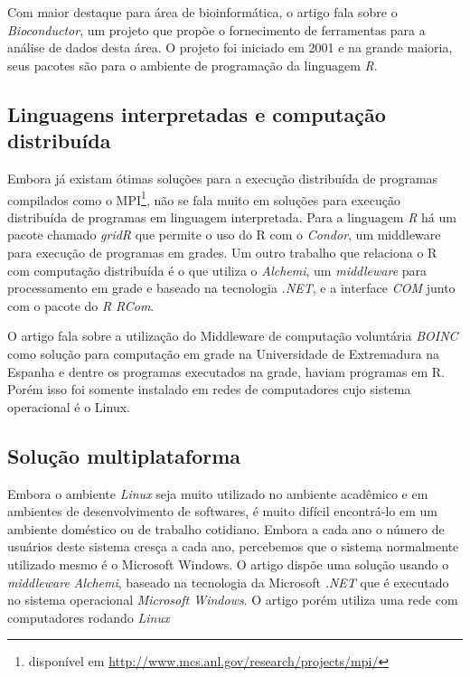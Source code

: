 Com maior destaque para área de bioinformática, o artigo 
\cite{bioconductor} fala sobre o \emph{Bioconductor}, um projeto  que propõe o fornecimento 
de ferramentas para a análise de dados desta área. O projeto foi iniciado em 2001 e na grande maioria, 
seus pacotes são para o ambiente de programação da linguagem \emph{R}.

\subsection{Linguagens interpretadas e computação distribuída}

Embora já existam ótimas soluções para a execução distribuída de programas compilados como o
 MPI\footnote{disponível em \url{http://www.mcs.anl.gov/research/projects/mpi/}}, não se fala muito em soluções 
para execução distribuída de programas em linguagem interpretada. 
Para a linguagem \emph{R} há um pacote chamado \emph{gridR} que permite o uso do R com o \emph{Condor}, %
um middleware para execução de programas em grades.  
Um outro trabalho que relaciona o R com computação distribuída é o \cite{Dias} que 
utiliza o \emph{Alchemi}, um \textit{middleware} para processamento em grade e baseado na 
tecnologia \textit{.NET}, e a interface \textit{COM} junto com o pacote do \emph{R}
\emph{RCom}.  


O artigo \cite{boinc} fala sobre a utilização do Middleware de computação voluntária \emph{BOINC} como solução para computação 
em grade na Universidade de Extremadura na Espanha e dentre os programas executados na grade, haviam
programas em R. Porém isso foi somente instalado em redes de computadores cujo sistema
operacional é o Linux. 


\subsection{Solução multiplataforma}

Embora o ambiente \emph{Linux} seja muito utilizado no ambiente acadêmico e em ambientes de desenvolvimento de softwares, é
muito difícil encontrá-lo em um ambiente doméstico ou de trabalho cotidiano. Embora a cada ano o número de usuários deste 
sistema cresça a cada ano, percebemos que o sistema normalmente utilizado mesmo é o Microsoft Windows. O artigo \cite{Dias}
dispõe uma solução usando o \emph{middleware} \emph{Alchemi}, baseado na tecnologia da Microsoft \emph{.NET} que é executado
no sistema operacional \emph{Microsoft Windows}. O artigo \cite{boinc} porém utiliza uma rede com computadores rodando \emph{Linux}

